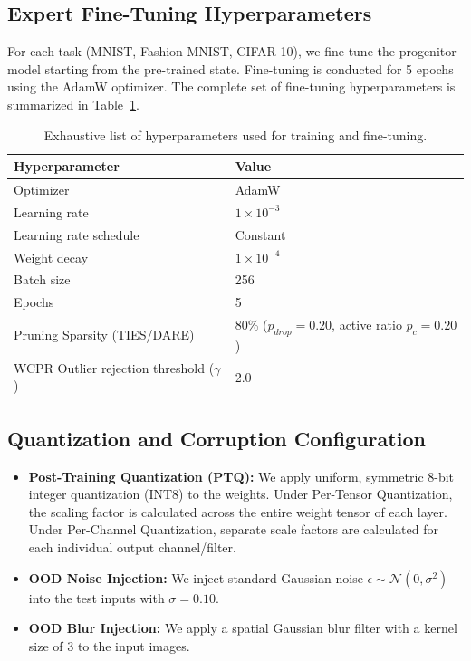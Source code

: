 \documentclass{article}
\theoremstyle{plain}
\theoremstyle{definition}
\theoremstyle{remark}
\begin{document}
\subsection{Expert Fine-Tuning Hyperparameters}
For each task (MNIST, Fashion-MNIST, CIFAR-10), we fine-tune the progenitor model starting from the pre-trained state. Fine-tuning is conducted for 5 epochs using the AdamW optimizer. The complete set of fine-tuning hyperparameters is summarized in Table~\ref{tab:hyperparams}.

\begin{table}[h]
\centering
\caption{Exhaustive list of hyperparameters used for training and fine-tuning.}
\label{tab:hyperparams}
\begin{tabular}{ll}
\toprule
\textbf{Hyperparameter} & \textbf{Value} \\
\midrule
Optimizer & AdamW \\
Learning rate & $1 \times 10^{-3}$ \\
Learning rate schedule & Constant \\
Weight decay & $1 \times 10^{-4}$ \\
Batch size & 256 \\
Epochs & 5 \\
Pruning Sparsity (TIES/DARE) & 80\% ($p_{drop} = 0.20$, active ratio $p_c=0.20$) \\
WCPR Outlier rejection threshold ($\gamma$) & 2.0 \\
\bottomrule
\end{tabular}
\end{table}

\subsection{Quantization and Corruption Configuration}
\begin{itemize}
    \item \textbf{Post-Training Quantization (PTQ):} We apply uniform, symmetric 8-bit integer quantization (INT8) to the weights. Under Per-Tensor Quantization, the scaling factor is calculated across the entire weight tensor of each layer. Under Per-Channel Quantization, separate scale factors are calculated for each individual output channel/filter.
    \item \textbf{OOD Noise Injection:} We inject standard Gaussian noise $\epsilon \sim \mathcal{N}(0, \sigma^2)$ into the test inputs with $\sigma = 0.10$.
    \item \textbf{OOD Blur Injection:} We apply a spatial Gaussian blur filter with a kernel size of 3 to the input images.
\end{itemize}
\end{document}

